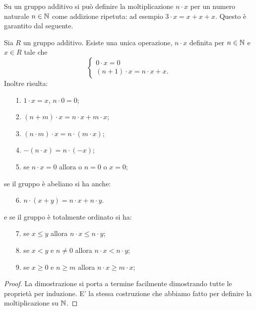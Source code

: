 Su un gruppo additivo si può definire la moltiplicazione $n\cdot x$ per un numero 
naturale $n\in{\mathbb N}$ come addizione ripetuta:
ad esempio $3\cdot x = x + x + x$.
Questo è garantito dal seguente.
%
\begin{theorem}
  \label{th:addizione_ripetuta}%
Sia $R$ un gruppo additivo. 
Esiste una unica operazione, $n \cdot x$ definita per $n\in {\mathbb N}$ 
e $x\in R$ tale che
\[
\begin{cases}
  0\cdot x  = 0 \\
  (n+1) \cdot x = n\cdot x + x.
\end{cases}  
\]
Inoltre risulta:
\begin{enumerate}
  \item[1.] $1\cdot x = x$, $n\cdot 0 = 0$;
  \item[2.] $(n+m)\cdot x = n\cdot x + m\cdot x$; 
  \item[3.] $(n\cdot m)\cdot x = n\cdot (m\cdot x)$;
  \item[4.] $-(n\cdot x) = n\cdot(-x)$;
  \item[5.] se $n\cdot x = 0$ allora o $n=0$ o $x=0$;
\end{enumerate}
se il gruppo è abeliano si ha anche:
\begin{enumerate}
\item[6.] $n\cdot(x+y) = n\cdot x + n\cdot y$.
\end{enumerate}
e se il gruppo è totalmente ordinato si ha:
\begin{enumerate}
  \item[7.] se $x \le y$ allora $n\cdot x \le n\cdot y$;
  \item[8.] se $x < y$ e $n \neq 0$ allora $n\cdot x < n\cdot y$;
  \item[9.] se $x\ge 0$ e $n\ge m$ allora $n\cdot x\ge m\cdot x$;
\end{enumerate}
\end{theorem}
%
\begin{proof}
La dimostrazione si porta a termine facilmente dimostrando tutte le proprietà 
per induzione.
E' la stessa costruzione che abbiamo fatto per definire 
la moltiplicazione su ${\mathbb N}$.
\end{proof}

